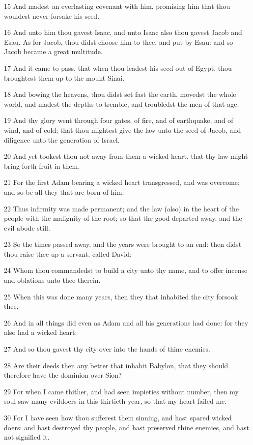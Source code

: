 \par 15 And madest an everlasting covenant with him, promising him that thou wouldest never forsake his seed.
\par 16 And unto him thou gavest Isaac, and unto Isaac also thou gavest Jacob and Esau. As for Jacob, thou didst choose him to thee, and put by Esau: and so Jacob became a great multitude.
\par 17 And it came to pass, that when thou leadest his seed out of Egypt, thou broughtest them up to the mount Sinai.
\par 18 And bowing the heavens, thou didst set fast the earth, movedst the whole world, and madest the depths to tremble, and troubledst the men of that age.
\par 19 And thy glory went through four gates, of fire, and of earthquake, and of wind, and of cold; that thou mightest give the law unto the seed of Jacob, and diligence unto the generation of Israel.
\par 20 And yet tookest thou not away from them a wicked heart, that thy law might bring forth fruit in them.
\par 21 For the first Adam bearing a wicked heart transgressed, and was overcome; and so be all they that are born of him.
\par 22 Thus infirmity was made permanent; and the law (also) in the heart of the people with the malignity of the root; so that the good departed away, and the evil abode still.
\par 23 So the times passed away, and the years were brought to an end: then didst thou raise thee up a servant, called David:
\par 24 Whom thou commandedst to build a city unto thy name, and to offer incense and oblations unto thee therein.
\par 25 When this was done many years, then they that inhabited the city forsook thee,
\par 26 And in all things did even as Adam and all his generations had done: for they also had a wicked heart:
\par 27 And so thou gavest thy city over into the hands of thine enemies.
\par 28 Are their deeds then any better that inhabit Babylon, that they should therefore have the dominion over Sion?
\par 29 For when I came thither, and had seen impieties without number, then my soul saw many evildoers in this thirtieth year, so that my heart failed me.
\par 30 For I have seen how thou sufferest them sinning, and hast spared wicked doers: and hast destroyed thy people, and hast preserved thine enemies, and hast not signified it.
